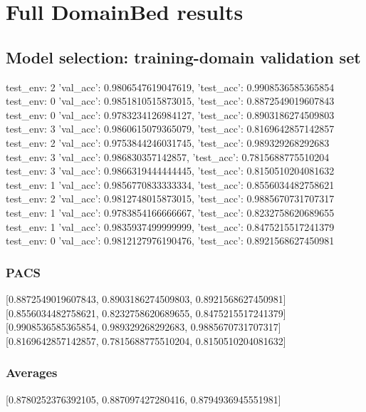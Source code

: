 \documentclass{article}
\begin{document}
\section{Full DomainBed results}

\subsection{Model selection: training-domain validation set}
test_env: 2
{'val_acc': 0.9806547619047619, 'test_acc': 0.9908536585365854}
test_env: 0
{'val_acc': 0.9851810515873015, 'test_acc': 0.8872549019607843}
test_env: 0
{'val_acc': 0.9783234126984127, 'test_acc': 0.8903186274509803}
test_env: 3
{'val_acc': 0.9860615079365079, 'test_acc': 0.8169642857142857}
test_env: 2
{'val_acc': 0.9753844246031745, 'test_acc': 0.989329268292683}
test_env: 3
{'val_acc': 0.986830357142857, 'test_acc': 0.7815688775510204}
test_env: 3
{'val_acc': 0.9866319444444445, 'test_acc': 0.8150510204081632}
test_env: 1
{'val_acc': 0.9856770833333334, 'test_acc': 0.8556034482758621}
test_env: 2
{'val_acc': 0.9812748015873015, 'test_acc': 0.9885670731707317}
test_env: 1
{'val_acc': 0.9783854166666667, 'test_acc': 0.8232758620689655}
test_env: 1
{'val_acc': 0.9835937499999999, 'test_acc': 0.8475215517241379}
test_env: 0
{'val_acc': 0.9812127976190476, 'test_acc': 0.8921568627450981}

\subsubsection{PACS}
[0.8872549019607843, 0.8903186274509803, 0.8921568627450981]
[0.8556034482758621, 0.8232758620689655, 0.8475215517241379]
[0.9908536585365854, 0.989329268292683, 0.9885670731707317]
[0.8169642857142857, 0.7815688775510204, 0.8150510204081632]

\begin{center}
\end{center}

\subsubsection{Averages}
[0.8780252376392105, 0.887097427280416, 0.8794936945551981]

\begin{center}
\end{center}
\end{document}
